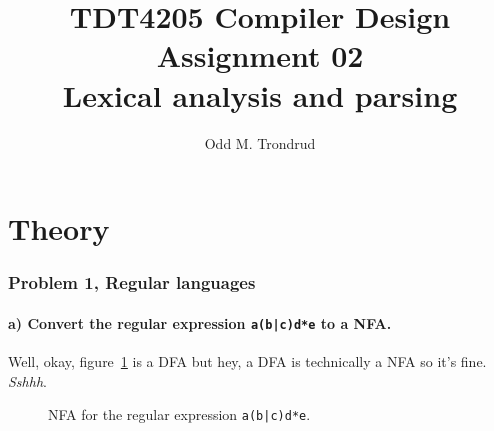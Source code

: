 \documentclass[12pt]{article}
\title{TDT4205 Compiler Design\\
Assignment 02\\
\textbf{Lexical analysis and parsing}}
\author{Odd M. Trondrud}
\begin{document}
\maketitle

\part{Theory}
\section{Problem 1, Regular languages}
\subsection{a) Convert the regular expression \texttt{a(b|c)d*e} to a NFA.}
Well, okay, figure~\ref{fig:1-1-a} is a DFA but hey, a DFA is technically a NFA so it's fine. \textit{Sshhh}.
\begin{figure}[H]
\begin{center}

\caption{NFA for the regular expression \texttt{a(b|c)d*e}.}
\label{fig:1-1-a}
\end{center}
\end{figure}
\end{document}
